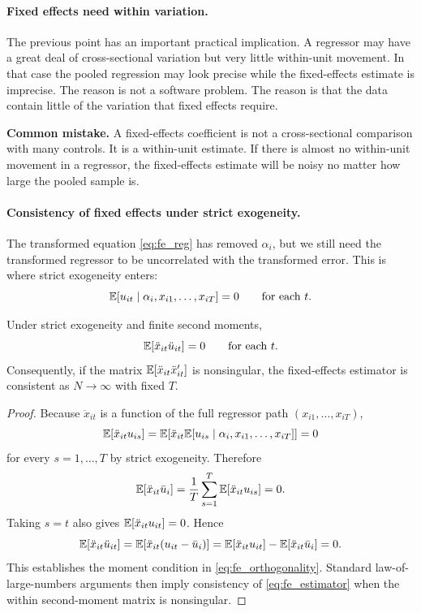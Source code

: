 \paragraph{Fixed effects need within variation.}
The previous point has an important practical implication. A regressor may have a great deal of cross-sectional variation but very little within-unit movement. In that case the pooled regression may look precise while the fixed-effects estimate is imprecise. The reason is not a software problem. The reason is that the data contain little of the variation that fixed effects require.

\begin{boxF}
\textbf{Common mistake.}
A fixed-effects coefficient is not a cross-sectional comparison with many controls. It is a within-unit estimate. If there is almost no within-unit movement in a regressor, the fixed-effects estimate will be noisy no matter how large the pooled sample is.
\end{boxF}

\paragraph{Consistency of fixed effects under strict exogeneity.}
The transformed equation \eqref{eq:fe_reg} has removed $\alpha_i$, but we still need the transformed regressor to be uncorrelated with the transformed error. This is where strict exogeneity enters:
\[
\mathbb{E}[u_{it}\mid \alpha_i, x_{i1},\ldots,x_{iT}] = 0
\qquad \text{for each } t.
\]

\begin{thmN}
Under strict exogeneity and finite second moments,
\begin{equation}
\mathbb{E}[\ddot{x}_{it}\ddot{u}_{it}] = 0
\qquad \text{for each } t.
\label{eq:fe_orthogonality}
\end{equation}
Consequently, if the matrix $\mathbb{E}[\ddot{x}_{it}\ddot{x}_{it}']$ is nonsingular, the fixed-effects estimator is consistent as $N\to\infty$ with fixed $T$.
\end{thmN}

\begin{proof}
Because $\ddot{x}_{it}$ is a function of the full regressor path $(x_{i1},\ldots,x_{iT})$,
\[
\mathbb{E}[\ddot{x}_{it}u_{is}]
= \mathbb{E}\!\left[\ddot{x}_{it}\mathbb{E}[u_{is}\mid \alpha_i,x_{i1},\ldots,x_{iT}]\right] = 0
\]
for every $s=1,\ldots,T$ by strict exogeneity. Therefore
\[
\mathbb{E}[\ddot{x}_{it}\bar{u}_i]
= \frac{1}{T}\sum_{s=1}^T \mathbb{E}[\ddot{x}_{it}u_{is}] = 0.
\]
Taking $s=t$ also gives $\mathbb{E}[\ddot{x}_{it}u_{it}]=0$. Hence
\[
\mathbb{E}[\ddot{x}_{it}\ddot{u}_{it}]
= \mathbb{E}[\ddot{x}_{it}(u_{it}-\bar{u}_i)]
= \mathbb{E}[\ddot{x}_{it}u_{it}] - \mathbb{E}[\ddot{x}_{it}\bar{u}_i]
= 0.
\]
This establishes the moment condition in \eqref{eq:fe_orthogonality}. Standard law-of-large-numbers arguments then imply consistency of \eqref{eq:fe_estimator} when the within second-moment matrix is nonsingular.
\end{proof}

